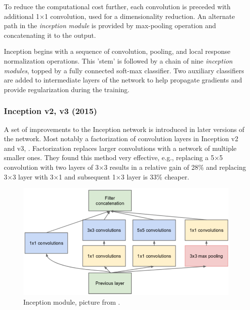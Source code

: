 To reduce the computational cost further, each convolution is preceded with additional 1$\times$1 convolution, used for a dimensionality reduction. An alternate path in the \textit{inception module} is provided by max-pooling operation and concatenating it to the output.

Inception begins with a sequence of convolution, pooling, and local response normalization operations. This 'stem' is followed by a chain of nine \textit{inception modules}, topped by a fully connected soft-max classifier. Two auxiliary classifiers are added to intermediate layers of the network to help propagate gradients and provide regularization during the training.

\subsubsection{Inception v2, v3 (2015)}
A set of improvements to the Inception network is introduced in later versions of the network. Most notably a factorization of convolution layers in Inception v2 and v3, \citeauthor{bib:inception2} \cite{bib:inception2}. Factorization replaces larger convolutions with a network of multiple smaller ones. They found this method very effective, e.g., replacing a 5$\times$5 convolution with two layers of 3$\times$3 results in a relative gain of 28\% and replacing 3$\times$3 layer with 3$\times$1 and subsequent 1$\times$3 layer is 33\% cheaper.

\begin{figure}
    \includegraphics[width=\textwidth]{img/inception}
    \caption[Inception module]%
    {Inception module, picture from \cite[figure 2]{bib:googlenet}.}
    \label{fig:incept_mod}
\end{figure}

